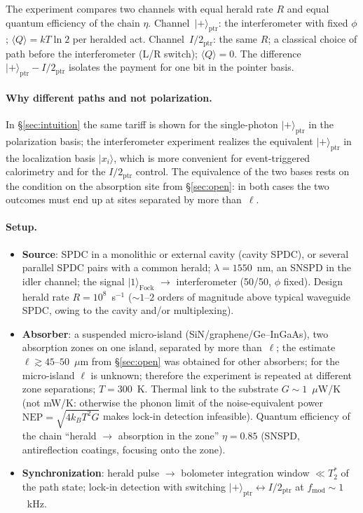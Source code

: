 \documentclass[11pt,a4paper]{article}
\newcommand{\Sref}[1]{\hyperref[#1]{\S\ref{#1}}}
\begin{document}
The experiment compares two channels with equal herald rate $R$ and equal quantum efficiency of the chain $\eta$. Channel~$|{+}\rangle_{\mathrm{ptr}}$: the interferometer with fixed $\phi$; $\langle Q\rangle = kT\ln 2$ per heralded act. Channel~$I/2_{\mathrm{ptr}}$: the same $R$; a classical choice of path before the interferometer (L/R switch); $\langle Q\rangle = 0$. The difference $|{+}\rangle_{\mathrm{ptr}} - I/2_{\mathrm{ptr}}$ isolates the payment for one bit in the pointer basis.

\paragraph{Why different paths and not polarization.}
In \Sref{sec:intuition} the same tariff is shown for the single-photon $|{+}\rangle_{\mathrm{ptr}}$ in the polarization basis; the interferometer experiment realizes the equivalent $|{+}\rangle_{\mathrm{ptr}}$ in the localization basis $|x_i\rangle$, which is more convenient for event-triggered calorimetry and for the $I/2_{\mathrm{ptr}}$ control. The equivalence of the two bases rests on the condition on the absorption site from \Sref{sec:open}: in both cases the two outcomes must end up at sites separated by more than~$\ell$.

\paragraph{Setup.}
\begin{itemize}
\item \textbf{Source}: SPDC in a monolithic or external cavity (cavity SPDC), or several parallel SPDC pairs with a common herald; $\lambda=1550$~nm, an SNSPD in the idler channel; the signal $|1\rangle_{\mathrm{Fock}}$ $\to$ interferometer (50/50, $\phi$ fixed). Design herald rate $R=10^{8}$~s$^{-1}$ ($\sim 1$--$2$ orders of magnitude above typical waveguide SPDC, owing to the cavity and/or multiplexing).
\item \textbf{Absorber}: a suspended micro-island (SiN/graphene/Ge--InGaAs), two absorption zones on one island, separated by more than~$\ell$; the estimate $\ell\gtrsim 45$--$50$~$\mu$m from \Sref{sec:open} was obtained for other absorbers; for the micro-island $\ell$ is unknown; therefore the experiment is repeated at different zone separations; $T=300$~K. Thermal link to the substrate $G\sim 1$~$\mu$W/K (not mW/K: otherwise the phonon limit of the noise-equivalent power $\mathrm{NEP}=\sqrt{4k_BT^2G}$ makes lock-in detection infeasible). Quantum efficiency of the chain ``herald $\to$ absorption in the zone'' $\eta=0.85$ (SNSPD, antireflection coatings, focusing onto the zone).
\item \textbf{Synchronization}: herald pulse $\to$ bolometer integration window $\ll T_2^*$ of the path state; lock-in detection with switching $|{+}\rangle_{\mathrm{ptr}}\leftrightarrow I/2_{\mathrm{ptr}}$ at $f_{\mathrm{mod}}\sim 1$~kHz.
\end{itemize}
\end{document}
